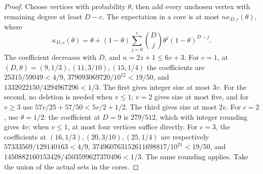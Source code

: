 \documentclass[11pt,a4paper]{article}
\theoremstyle{definition}
\begin{document}
\begin{proof}
Choose vertices with probability $\theta$, then add every unchosen vertex with remaining degree at least $D-c$. The expectation in a core is at most $n\kappa_{D,c}(\theta)$, where
\[
\kappa_{D,c}(\theta)=\theta+
(1-\theta)\sum_{j=0}^{c}\binom Dj\theta^j(1-\theta)^{D-j}.
\]
The coefficient decreases with $D$, and $n=2z+1\le6v+3$.
For $c=1$, at $(D,\theta)=(9,1/3),(11,3/10),(15,1/4)$ the coefficients are
$25315/59049<4/9$,
$379093069720/10^{12}<19/50$, and
$1332022150/4294967296<1/3$.
The first gives integer size at most $3v$.
For the second, no deletion is needed when $v\le1$; $v=2$ gives size at most five, and for $v\ge3$ use
$57v/25+57/50<5v/2+1/2$.
The third gives size at most $2v$.
For $c=2$, use $\theta=1/2$: the coefficient at $D=9$ is $279/512$, which with integer rounding gives $4v$; when $v\le1$, at most four vertices suffice directly.
For $c=3$, the coefficients at $(16,1/3),(20,3/10),(25,1/4)$ are respectively
$57333569/129140163<4/9$,
$374960763152611698817/10^{21}<19/50$, and
$1450882160153428/4503599627370496<1/3$.
The same rounding applies. Take the union of the actual sets in the cores.
\end{proof}
\end{document}
